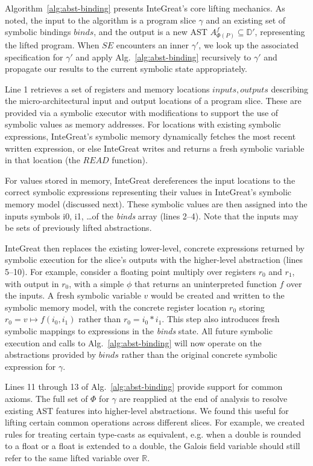 Algorithm~\ref{alg:abst-binding} presents InteGreat's core lifting mechanics.
As noted, the input to the algorithm is a program slice $\gamma$ and an existing set of symbolic bindings $binds$, and the output is a new AST $A_{\Phi(P)}^{f} \subseteq \mathbb{D}'$, representing the lifted program.
When $SE$ encounters an inner $\gamma'$, we look up the associated specification for $\gamma'$ and apply Alg.~\ref{alg:abst-binding} recursively to $\gamma'$ and propagate our results to the current symbolic state appropriately.

Line 1 retrieves a set of registers and memory locations $inputs, outputs$ describing the micro-architectural input and output locations of a program slice.
These are provided via a symbolic executor with modifications to support the use of symbolic values as memory addresses.
For locations with existing symbolic expressions, InteGreat's symbolic memory dynamically fetches the most recent written expression, or else InteGreat writes and returns a fresh symbolic variable in that location (the $READ$ function).

For values stored in memory, InteGreat dereferences the input locations to the correct symbolic expressions representing their values in InteGreat's symbolic memory model (discussed next).
These symbolic values are then assigned into the inputs symbols i0, i1, \dots of the \emph{binds} array (lines 2--4).
Note that the inputs may be sets of previously lifted abstractions.

InteGreat then replaces the existing lower-level, concrete expressions returned by symbolic execution for the slice's outputs with the higher-level abstraction (lines 5--10).
For example, consider a floating point multiply over registers $r_{0}$ and $r_{1}$, with output in $r_{0}$, with a simple $\phi$ that returns an uninterpreted function $f$ over the inputs.
A fresh symbolic variable $v$ would be created and written to the symbolic memory model, with the concrete register location $r_{0}$ storing $r_{0} = v \mapsto f(i_{0},i_{1})$ rather than $r_{0} = i_{0} * i_{1}$.
This step also introduces fresh symbolic mappings to expressions in the \emph{binds} state.
All future symbolic execution and calls to Alg.~\ref{alg:abst-binding} will now operate on the abstractions provided by $binds$ rather than the original concrete symbolic expression for $\gamma$.

Lines 11 through 13 of Alg.~\ref{alg:abst-binding} provide support for common axioms.
The full set of $\Phi$ for $\gamma$ are reapplied at the end of analysis to resolve existing AST features into higher-level abstractions.
We found this useful for lifting certain common operations across different slices.
For example, we created rules for treating certain type-casts as equivalent, e.g. when a double is rounded to a float or a float is extended to a double, the Galois field variable should still refer to the same lifted variable over $\mathbb{R}$.

